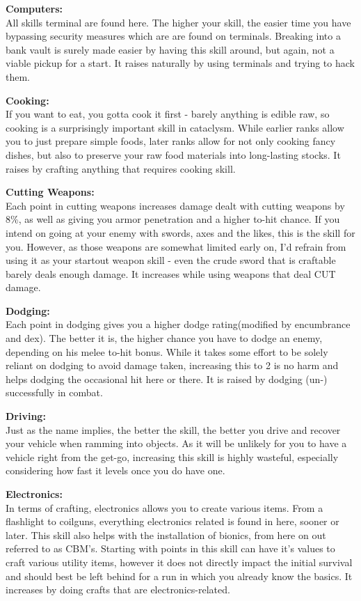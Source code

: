 \textbf{Computers:}\\All skills terminal are found here. The higher your skill, the easier time you have bypassing security measures which are are found on terminals. Breaking into a bank vault is surely made easier by having this skill around, but again, not a viable pickup for a start. It raises naturally by using terminals and trying to hack them.

\textbf{Cooking:}\\If you want to eat, you gotta cook it first - barely anything is edible raw, so cooking is a surprisingly important skill in cataclysm. While earlier ranks allow you to just prepare simple foods, later ranks allow for not only cooking fancy dishes, but also to preserve your raw food materials into long-lasting stocks. It raises by crafting anything that requires cooking skill.

\textbf{Cutting Weapons:}\\Each point in cutting weapons increases damage dealt with cutting weapons by 8\%, as well as giving you armor penetration and a higher to-hit chance. If you intend on going at your enemy with swords, axes and the likes, this is the skill for you. However, as those weapons are somewhat limited early on, I'd refrain from using it as your startout weapon skill - even the crude sword that is craftable barely deals enough damage. It increases while using weapons that deal CUT damage.

\textbf{Dodging:}\\Each point in dodging gives you a higher dodge rating(modified by encumbrance and dex). The better it is, the higher chance you have to dodge an enemy, depending on his melee to-hit bonus. While it takes some effort to be solely reliant on dodging to avoid damage taken, increasing this to 2 is no harm and helps dodging the occasional hit here or there. It is raised by dodging (un-) successfully in combat.

\textbf{Driving:}\\Just as the name implies, the better the skill, the better you drive and recover your vehicle when ramming into objects. As it will be unlikely for you to have a vehicle right from the get-go, increasing this skill is highly wasteful, especially considering how fast it levels once you do have one.

\textbf{Electronics:}\\In terms of crafting, electronics allows you to create various items. From a flashlight to coilguns, everything electronics related is found in here, sooner or later. This skill also helps with the installation of bionics, from here on out referred to as CBM's. Starting with points in this skill can have it's values to craft various utility items, however it does not directly impact the initial survival and should best be left behind for a run in which you already know the basics. It increases by doing crafts that are electronics-related.

